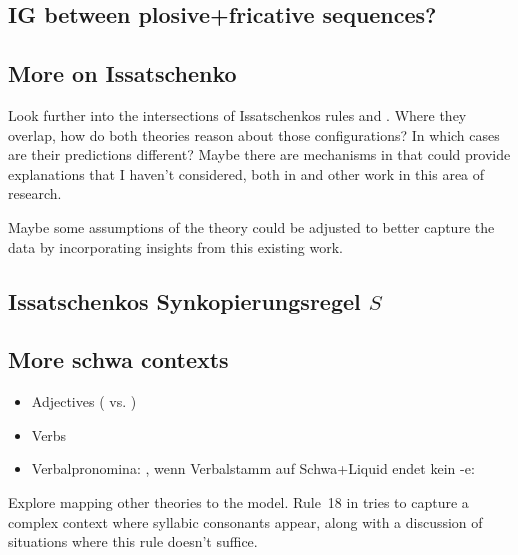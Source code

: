 

\subsection{IG between plosive+fricative sequences?}


\subsection{More on Issatschenko  \CVCV}
Look further into the intersections of Issatschenkos rules
and \CVCV. Where they overlap, how do both theories reason about those configurations?
In which cases are their predictions different?
Maybe there are mechanisms in \CVCV that could provide explanations that I haven't considered,
both in \cite{scheer2004} and other work in this area of research.

Maybe some assumptions of the theory could be adjusted to better capture the data
by incorporating insights from this existing work.



\subsection{Issatschenkos Synkopierungsregel $S$}


\subsection{More schwa contexts}
\begin{itemize}
\item Adjectives ( vs. )
\item Verbs
\item Verbalpronomina: ,
  wenn Verbalstamm auf Schwa+Liquid endet kein -e:
\end{itemize}


Explore mapping other theories to the \CVCV model.
Rule~18 in \cite[p.~176]{hohleVater1978} tries to capture a complex context where
syllabic consonants appear, along with a discussion of situations where this
rule doesn't suffice.
